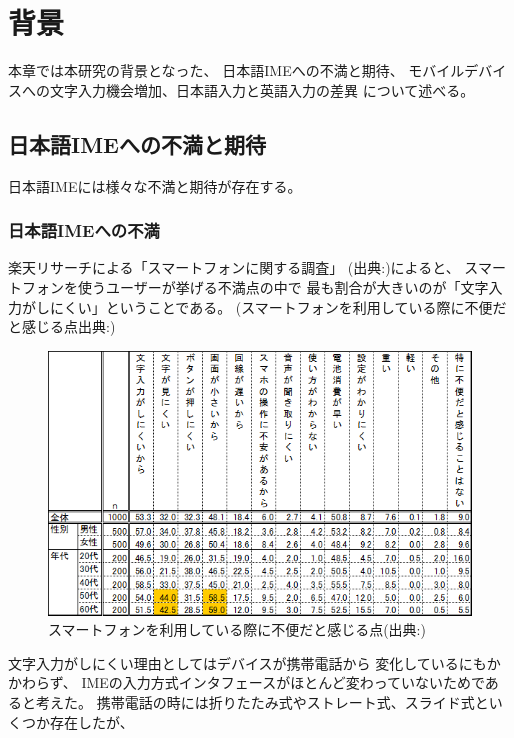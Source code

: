 \chapter{背景}
\label{chap:background}
本章では本研究の背景となった、
日本語IMEへの不満と期待、
モバイルデバイスへの文字入力機会増加、日本語入力と英語入力の差異
について述べる。

\newpage
\section{日本語IMEへの不満と期待}
日本語IMEには様々な不満と期待が存在する。

\subsection{日本語IMEへの不満}
楽天リサーチによる「スマートフォンに関する調査」
(出典:\cite{rakutensmartphone})によると、
スマートフォンを使うユーザーが挙げる不満点の中で
最も割合が大きいのが「文字入力がしにくい」ということである。
(スマートフォンを利用している際に不便だと感じる点出典:\cite{rakutensmartphone})
\begin{figure}[htbp]
  \begin{center}
    \includegraphics[width=140mm,bb=0 0 589 368]{images/dissatisfaction.png}
  \end{center}
  \caption{スマートフォンを利用している際に不便だと感じる点(出典:\cite{rakutensmartphone})}
  \label{fig:dissatisfaction}
\end{figure}
文字入力がしにくい理由としてはデバイスが携帯電話から
変化しているにもかかわらず、
IMEの入力方式インタフェースがほとんど変わっていないためであると考えた。
携帯電話の時には折りたたみ式やストレート式、スライド式といくつか存在したが、
